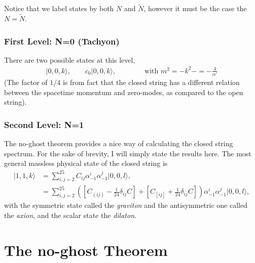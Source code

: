 \documentclass[notitlepage,amsmath,amssymb,aps, pra, 10pt]{revtex4-1}
\begin{document}
        Notice that we label states by both $N$ and $\tilde N$, however it must be the case the $N = \tilde N$.

        \subsubsection{First Level: N=0 (Tachyon)}

                    There are two possible states at this level,
                    \begin{align}
                        |0, 0, k\rangle, \qquad c_0|0, 0, k\rangle, \qquad \qquad \text{with } m^2 = -k^2 -=-\frac{4}{\alpha'}
                    \end{align}
                    (The factor of $1/4$ is from fact that the closed string has a different relation between the spacetime momentum and zero-modes, as compared to the open string).
        \subsubsection{Second Level: N=1}

                    The no-ghost theorem provides a nice way of calculating the closed string spectrum. For the sake of brevity, I will simply state the results here. The most general massless physical state of the closed string is
                    \begin{align}
                        | 1, 1 , k \rangle &=
                        \sum_{i,j = 2}^{25} C_{ij} \alpha_{-1}^i \alpha_{-1}^j |0,0,l\rangle,\\
                        &=
                        \sum_{i,j = 2}^{25}
                        \left(
                        \left[ C_{(ij)}
                        -
                        \frac{1}{24}\delta_{ij}C\right]
                        +
                        \left[C_{[ij]}
                        +
                        \frac{1}{24}\delta_{ij}C\right]
                        \right)\alpha_{-1}^i \alpha_{-1}^j |0,0,l\rangle,
                    \end{align}
                    with the symmetric state called the \emph{graviton} and the antisymmetric one called the \emph{axion}, and the scalar state the \emph{dilaton}.

\section{The no-ghost Theorem}
\end{document}
